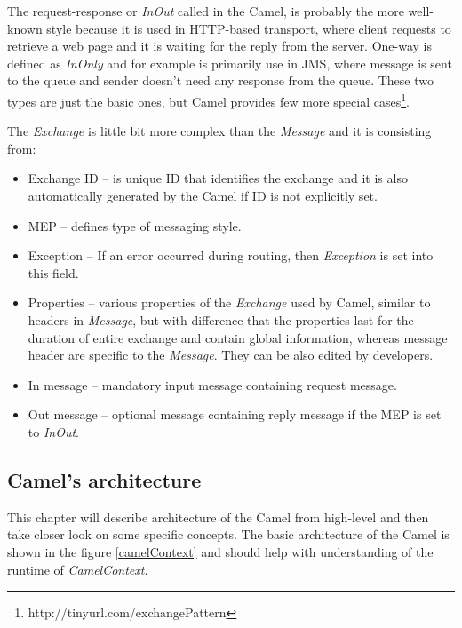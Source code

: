\documentclass[12pt,final,oneside]{fithesis2}
\begin{document}
The request-response or \textit{InOut} called in the Camel, is probably the more well-known style because it is used in HTTP-based transport, where client requests to retrieve a web page and it is waiting for the reply from the server. One-way is defined as \textit{InOnly} and for example is primarily use in JMS, where message is sent to the queue and sender doesn't need any response from the queue. These two types are just the basic ones, but Camel provides few more special cases\footnote{http://tinyurl.com/exchangePattern}.\cite{camel-exchange}

The \textit{Exchange} is little bit more complex than the \textit{Message} and it is consisting from\cite{camel-in-action}:
\begin{itemize}
\item
Exchange ID -- is unique ID that identifies the exchange and it is also automatically generated by the Camel if ID is not explicitly set.

\item
MEP -- defines type of messaging style.

\item
Exception -- If an error occurred during routing, then \textit{Exception} is set into this field.

\item
Properties -- various properties of the \textit{Exchange} used by Camel, similar to headers in \textit{Message}, but with difference that the properties last for the duration of entire exchange and contain global information, whereas message header are specific to the \textit{Message}. They can be also edited by developers.

\item
In message -- mandatory input message containing request message.

\item
Out message -- optional message containing reply message if the MEP is set to \textit{InOut}.
\end{itemize}


\subsection{Camel's architecture}
This chapter will describe architecture of the Camel from high-level and then take closer look on some specific concepts. The basic architecture of the Camel is shown in the figure \ref{camelContext} and should help with understanding of the runtime of \textit{CamelContext}.
\end{document}
